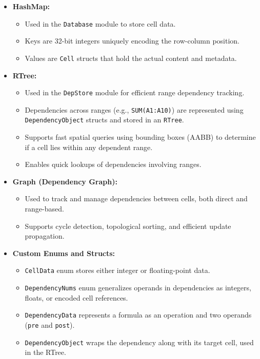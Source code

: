 \documentclass[12pt]{article}
\begin{document}
\begin{itemize}
    \item \textbf{HashMap:}
    \begin{itemize}
        \item Used in the \texttt{Database} module to store cell data.
        \item Keys are 32-bit integers uniquely encoding the row-column position.
        \item Values are \texttt{Cell} structs that hold the actual content and metadata.
    \end{itemize}

    \item \textbf{RTree:}
    \begin{itemize}
        \item Used in the \texttt{DepStore} module for efficient range dependency tracking.
        \item Dependencies across ranges (e.g., \texttt{SUM(A1:A10)}) are represented using \texttt{DependencyObject} structs and stored in an \texttt{RTree}.
        \item Supports fast spatial queries using bounding boxes (AABB) to determine if a cell lies within any dependent range.
        \item Enables quick lookups of dependencies involving ranges.
    \end{itemize}


    \item \textbf{Graph (Dependency Graph):}
    \begin{itemize}
        \item Used to track and manage dependencies between cells, both direct and range-based.
        \item Supports cycle detection, topological sorting, and efficient update propagation.
    \end{itemize}

    \item \textbf{Custom Enums and Structs:}
    \begin{itemize}
        \item \texttt{CellData} enum stores either integer or floating-point data.
        \item \texttt{DependencyNums} enum generalizes operands in dependencies as integers, floats, or encoded cell references.
        \item \texttt{DependencyData} represents a formula as an operation and two operands (\texttt{pre} and \texttt{post}).
        \item \texttt{DependencyObject} wraps the dependency along with its target cell, used in the RTree.
    \end{itemize}
\end{itemize}
\end{document}
